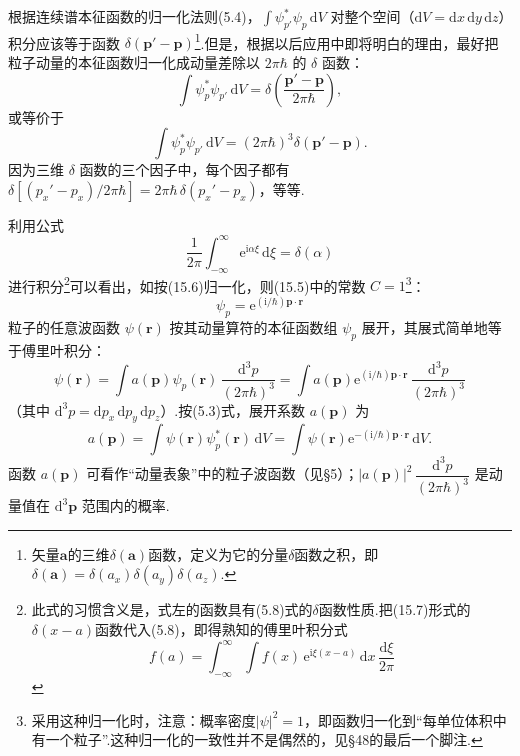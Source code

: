 根据连续谱本征函数的归一化法则(5.4)，$\int\psi_{p'}^{*}\psi_p\,\mathrm{d}V$ 对整个空间（$\mathrm{d}V=\mathrm{d}x\,\mathrm{d}y\,\mathrm{d}z$）积分应该等于函数 $\delta(\boldsymbol{p}'-\boldsymbol{p})$\footnote{矢量$\boldsymbol{a}$的三维$\delta(\boldsymbol{a})$函数，定义为它的分量$\delta$函数之积，即$\delta(\boldsymbol{a})=\delta(a_x)\delta(a_y)\delta(a_z)$.}.但是，根据以后应用中即将明白的理由，最好把粒子动量的本征函数归一化成动量差除以 $2\pi\hbar$ 的 $\delta$ 函数：
\begin{equation*}
  \int\psi_p^{*}\psi_{p'}\,\mathrm{d}V
  =\delta\left(\frac{\boldsymbol{p}'-\boldsymbol{p}}{2\pi\hbar}\right),
\end{equation*}
或等价于
\begin{equation}
  \int\psi_p^{*}\psi_{p'}\,\mathrm{d}V
  =(2\pi\hbar)^{3}\delta(\boldsymbol{p}'-\boldsymbol{p}).
\end{equation}
因为三维 $\delta$ 函数的三个因子中，每个因子都有
$\delta[(p_x'-p_x)/2\pi\hbar]=2\pi\hbar\,\delta(p_x'-p_x)$，等等.

利用公式
\begin{equation}
  \frac{1}{2\pi}\int_{-\infty}^{\infty}\mathrm{e}^{\mathrm{i}\alpha\xi}\,\mathrm{d}\xi
  =\delta(\alpha)
\end{equation}
进行积分\footnote{此式的习惯含义是，式左的函数具有(5.8)式的$\delta$函数性质.把(15.7)形式的$\delta(x-a)$函数代入(5.8)，即得熟知的傅里叶积分式
\begin{equation*}
  f(a)=\int_{-\infty}^{\infty}\int f(x)\,
  \mathrm{e}^{\mathrm{i}\xi(x-a)}\,\mathrm{d}x\,\frac{\mathrm{d}\xi}{2\pi}
\end{equation*}}可以看出，如按(15.6)归一化，则(15.5)中的常数 $C=1$\footnote{采用这种归一化时，注意：概率密度$|\psi|^{2}=1$，即函数归一化到“每单位体积中有一个粒子”.这种归一化的一致性并不是偶然的，见§48的最后一个脚注.}：
\begin{equation}
  \psi_p=\mathrm{e}^{(\mathrm{i}/\hbar)\boldsymbol{p}\cdot\boldsymbol{r}}
\end{equation}
粒子的任意波函数 $\psi(\boldsymbol{r})$ 按其动量算符的本征函数组 $\psi_p$ 展开，其展式简单地等于傅里叶积分：
\begin{equation}
  \psi(\boldsymbol{r})=\int a(\boldsymbol{p})\psi_p(\boldsymbol{r})\,
  \frac{\mathrm{d}^{3}p}{(2\pi\hbar)^{3}}
  =\int a(\boldsymbol{p})\mathrm{e}^{(\mathrm{i}/\hbar)\boldsymbol{p}\cdot\boldsymbol{r}}\,
  \frac{\mathrm{d}^{3}p}{(2\pi\hbar)^{3}}
\end{equation}
（其中 $\mathrm{d}^{3}p=\mathrm{d}p_x\,\mathrm{d}p_y\,\mathrm{d}p_z$）.按(5.3)式，展开系数 $a(\boldsymbol{p})$ 为
\begin{equation}
  a(\boldsymbol{p})=\int\psi(\boldsymbol{r})\psi_p^{*}(\boldsymbol{r})\,\mathrm{d}V
  =\int\psi(\boldsymbol{r})\mathrm{e}^{-(\mathrm{i}/\hbar)\boldsymbol{p}\cdot\boldsymbol{r}}\,\mathrm{d}V.
\end{equation}
函数 $a(\boldsymbol{p})$ 可看作“动量表象”中的粒子波函数（见§5）；$|a(\boldsymbol{p})|^{2}\,\dfrac{\mathrm{d}^{3}p}{(2\pi\hbar)^{3}}$ 是动量值在 $\mathrm{d}^{3}\boldsymbol{p}$ 范围内的概率.

